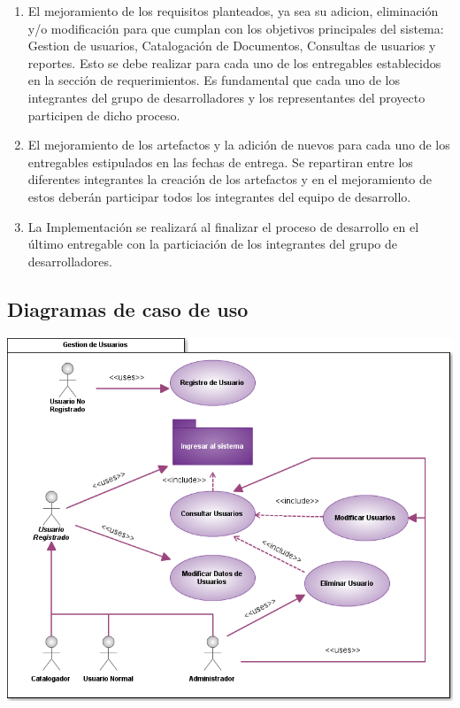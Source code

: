 \documentclass[]{article}
\begin{document}
	\begin{enumerate}
		\item El mejoramiento de los requisitos planteados, ya sea su adicion, eliminación y/o
		modificación para que cumplan con los objetivos principales del sistema: Gestion de
		usuarios, Catalogación de Documentos, Consultas de usuarios y reportes. Esto se debe
		realizar para cada uno de los entregables establecidos en la sección de requerimientos. Es
		fundamental que cada uno de los integrantes del grupo de desarrolladores y los
		representantes del proyecto participen de dicho proceso.

		\item El mejoramiento de los artefactos y la adición de nuevos para cada uno de los
		entregables estipulados en las fechas de entrega. Se repartiran entre los diferentes
		integrantes la creación de los artefactos y en el mejoramiento de estos deberán participar
		todos los integrantes del equipo de desarrollo.

		\item La Implementación se realizará al finalizar el proceso de desarrollo en el último
		entregable con la particiación de los integrantes del grupo de desarrolladores.
	\end{enumerate}

	
	\subsection{Diagramas de caso de uso}
	
	\begin{minipage}[c]{1\linewidth}
		\centering
		\includegraphics[scale=.6]{casosUso/CUGestionUsuarios}
	\end{minipage}	
	
\end{document}
